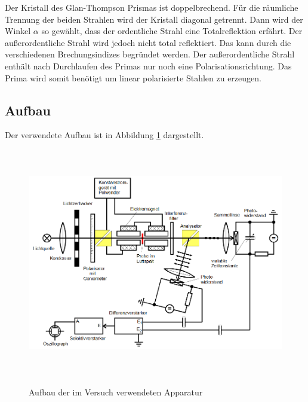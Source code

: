 Der Kristall des Glan-Thompson Prismas ist doppelbrechend.
Für die räumliche Trennung der beiden Strahlen wird der Kristall diagonal
getrennt. Dann wird der Winkel $\alpha$ so gewählt, dass der ordentliche Strahl
eine Totalreflektion erfährt. Der außerordentliche Strahl wird jedoch nicht
total reflektiert. Das kann durch die verschiedenen Brechungsindizes begründet
werden. Der außerordentliche Strahl enthält nach Durchlaufen des Primas nur noch
eine Polarisationsrichtung. Das Prima wird somit benötigt um linear polarisierte
Stahlen zu erzeugen.

\subsection{Aufbau}
Der verwendete Aufbau ist in Abbildung \ref{fig:aufbau} dargestellt.

\begin{figure}[H]
  \centering
  \includegraphics[width=14cm, height=10cm]{aufbau.png}
  \caption{Aufbau der im Versuch verwendeten Apparatur}
  \label{fig:aufbau}
  \cite{skript}
\end{figure}

